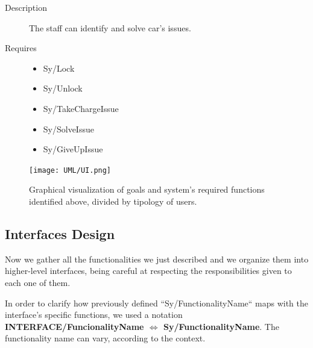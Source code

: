 \documentclass[11pt]{article} %
\begin{document}
\begin{description}
	\begin{description}
		\item[Description] The staff can identify and solve car’s issues.
		\item[Requires] \hfill
		\begin{itemize}
			\item Sy/Lock %
			\item Sy/Unlock %
			\item Sy/TakeChargeIssue  %
			\item Sy/SolveIssue %
			\item Sy/GiveUpIssue %
		\end{itemize}
	\end{description}
\end{description}


\begin{figure}[H]
	\centering
	\texttt{[image: UML/UI.png]}
	\caption{Graphical visualization of goals and system's required functions identified above, divided by tipology of users.}
\end{figure}	


\subsection{Interfaces Design}

Now we gather all the functionalities we just described and we organize them into higher-level interfaces, being careful at respecting the responsibilities given to each one of them.

In order to clarify how previously defined ``Sy/FunctionalityName`` maps with the interface's specific functions, we used a notation \textbf{INTERFACE/FuncionalityName $\Leftrightarrow$ Sy/FunctionalityName}. The functionality name can vary, according to the context.
\end{document}

